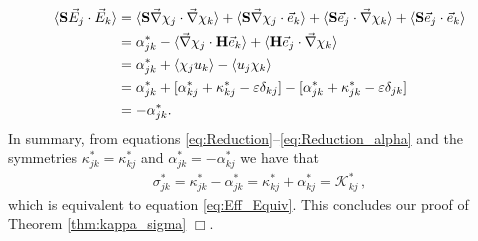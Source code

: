 \documentclass[11pt]{amsart}
\newcommand{\Hb}{\mathbf{H}}
\newcommand{\Sb}{\mathbf{S}}
\newcommand{\Kc}{\mathcal{K}}
\begin{document}
%
\begin{align}\label{eq:Reduction_alpha}    
   \langle\Sb\vec{E}_j\cdot\vec{E}_k\rangle&=\langle\Sb\vec{\nabla}\chi_j\cdot\vec{\nabla}\chi_k\rangle
                       +\langle\Sb\vec{\nabla}\chi_j\cdot\vec{e}_k\rangle+\langle\Sb\vec{e}_j\cdot\vec{\nabla}\chi_k\rangle
                       +\langle\Sb\vec{e}_j\cdot\vec{e}_k\rangle
                       \\
                       &=\alpha^*_{jk}-\langle\vec{\nabla}\chi_j\cdot\Hb\vec{e}_k\rangle+\langle\Hb\vec{e}_j\cdot\vec{\nabla}\chi_k\rangle
                       \notag\\
                       &=\alpha^*_{jk}+\langle\chi_ju_k\rangle-\langle u_j\chi_k\rangle
                       \notag\\
                       &=\alpha^*_{jk}+[\alpha^*_{kj}+\kappa^*_{kj}-\varepsilon\delta_{kj}]-[\alpha^*_{jk}+\kappa^*_{jk}-\varepsilon\delta_{jk}]
                       \notag\\
                       &=-\alpha^*_{jk}.
                       \notag
\end{align}
%
In summary, from equations
\eqref{eq:Reduction}--\eqref{eq:Reduction_alpha} and the
symmetries $\kappa^*_{jk}=\kappa^*_{kj}$ and $\alpha^*_{jk}=-\alpha^*_{kj}$ we have that 
%
\begin{align}\label{eq:Reduction_final}
  \sigma^*_{jk}=\kappa^*_{jk}-\alpha^*_{jk}=\kappa^*_{kj}+\alpha^*_{kj}=\Kc_{kj}^*\,,       
\end{align}
%
which is equivalent to equation \eqref{eq:Eff_Equiv}. This concludes
our proof of Theorem \ref{thm:kappa_sigma} $\Box$.     
\end{document}
